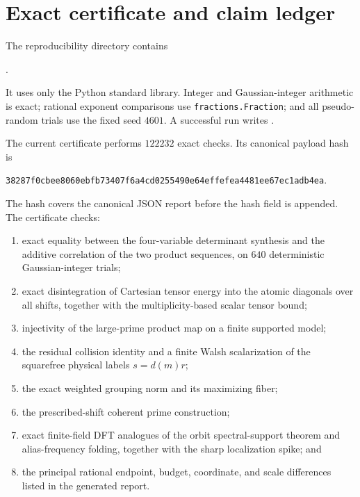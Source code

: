 \section{Exact certificate and claim ledger}
\label{sec:tpc46-certificate}

The reproducibility directory contains
\begin{center}
 .
\end{center}
It uses only the Python standard library.  Integer and Gaussian-integer
arithmetic is exact; rational exponent comparisons use
\texttt{fractions.Fraction}; and all pseudo-random trials use the fixed
seed \(4601\).  A successful run writes
.

The current certificate performs \(122232\) exact checks.  Its canonical
payload hash is
\begin{center}
\texttt{38287f0cbee8060ebfb73407f6a4cd0255490e64effefea4481ee67ec1adb4ea}.
\end{center}
The hash covers the canonical JSON report before the hash field is
appended.  The certificate checks:
\begin{enumerate}[label=\textup{(\roman*)},leftmargin=2.4em]
 \item exact equality between the four-variable determinant synthesis
 and the additive correlation of the two product sequences, on \(640\)
 deterministic Gaussian-integer trials;
 \item exact disintegration of Cartesian tensor energy into the atomic
 diagonals over all shifts, together with the multiplicity-based scalar
 tensor bound;
 \item injectivity of the large-prime product map on a finite supported
 model;
 \item the residual collision identity and a finite Walsh
 scalarization of the squarefree physical labels \(s=d(m)r\);
 \item the exact weighted grouping norm and its maximizing fiber;
 \item the prescribed-shift coherent prime construction;
 \item exact finite-field DFT analogues of the orbit
 spectral-support theorem and alias-frequency folding, together with
 the sharp localization spike; and
 \item the principal rational endpoint, budget, coordinate, and scale
 differences listed in the generated report.
\end{enumerate}

